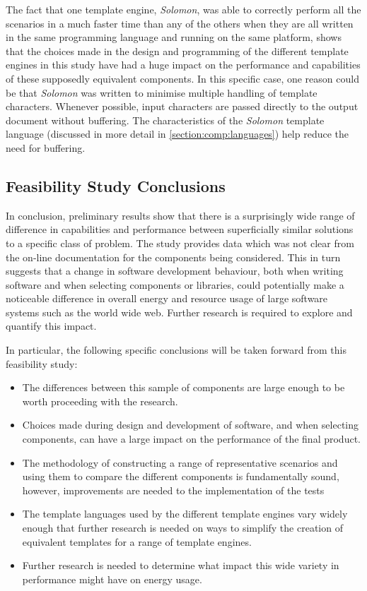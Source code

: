 The fact that one template engine, \emph{Solomon}, was able to correctly perform all the scenarios in a much faster time than any of the others when they are all written in the same programming language and running on the same platform, shows that the choices made in the design and programming of the different template engines in this study have had a huge impact on the performance and capabilities of these supposedly equivalent components. In this specific case, one reason could be that \emph{Solomon} was written to minimise multiple handling of template characters. Whenever possible, input characters are passed directly to the output document without buffering. The characteristics of the \emph{Solomon} template language (discussed in more detail in \autoref{section:comp:languages}) help reduce the need for buffering.

\subsection{Feasibility Study Conclusions}

In conclusion, preliminary results show that there is a surprisingly wide range of difference in capabilities and performance between superficially similar solutions to a specific class of problem. The study provides data which was not clear from the on-line documentation for the components being considered. This in turn suggests that a change in software development behaviour, both when writing software and when selecting components or libraries, could potentially make a noticeable difference in overall energy and resource usage of large software systems such as the world wide web. Further research is required to explore and quantify this impact.

In particular, the following specific conclusions will be taken forward from this feasibility study:

\begin{itemize}
\item The differences between this sample of components are large enough to be worth proceeding with the research.
\item Choices made during design and development of software, and when selecting components, can have a large impact on the performance of the final product.
\item The methodology of constructing a range of representative scenarios and using them to compare the different components is fundamentally sound, however, improvements are needed to the implementation of the tests
\item The template languages used by the different template engines vary widely enough that further research is needed on ways to simplify the creation of equivalent templates for a range of template engines.
\item Further research is needed to determine what impact this wide variety in performance might have on energy usage.
\end{itemize}
